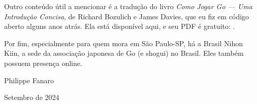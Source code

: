 Outro conteúdo útil a mencionar é a tradução do livro \emph{Como Jogar Go --- Uma Introdução Concisa}, de Richard Bozulich e James Davies, que eu fiz em código aberto alguns anos atrás. Ela está disponível aqui, e seu PDF é gratuito: .

Por fim, especialmente para quem mora em São Paulo-SP, há a Brasil Nihon Kiin, a sede da associação japonesa de Go (e shogui) no Brasil. Eles também possuem presença online.

\bigskip
\smallskip
\smallskip
\smallskip

\hspace*{\fill} Philippe Fanaro \hspace{0.115cm}

\hspace*{\fill} Setembro de 2024 \hspace{0.115cm}

\blankpage
\blankpage